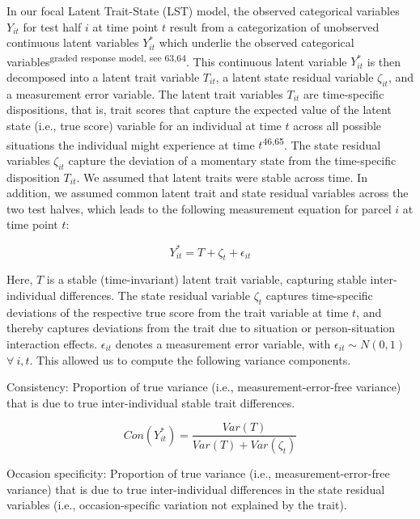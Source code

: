 \documentclass[
  man,floatsintext]{apa6}
\begin{document}
In our focal Latent Trait-State (LST) model, the observed categorical variables \(Y_{it}\) for test half \(i\) at time point \(t\) result from a categorization of unobserved continuous latent variables \(Y^*_{it}\) which underlie the observed categorical variables\textsuperscript{graded response model, see 63,64}. This continuous latent variable \(Y^*_{it}\) is then decomposed into a latent trait variable \(T_{it}\), a latent state residual variable \(\zeta_{it}\), and a measurement error variable. The latent trait variables \(T_{it}\) are time-specific dispositions, that is, trait scores that capture the expected value of the latent state (i.e., true score) variable for an individual at time \(t\) across all possible situations the individual might experience at time \(t\)\textsuperscript{46,65}. The state residual variables \(\zeta_{it}\) capture the deviation of a momentary state from the time-specific disposition \(T_{it}\). We assumed that latent traits were stable across time. In addition, we assumed common latent trait and state residual variables across the two test halves, which leads to the following measurement equation for parcel \(i\) at time point \(t\):

\begin{equation}
Y^*_{it}= T + \zeta_t + \epsilon_{it}
\end{equation}

Here, \(T\) is a stable (time-invariant) latent trait variable, capturing stable inter-individual differences. The state residual variable \(\zeta_t\) captures time-specific deviations of the respective true score from the trait variable at time \(t\), and thereby captures deviations from the trait due to situation or person-situation interaction effects. \(\epsilon_{it}\) denotes a measurement error variable, with \(\epsilon_{it} \sim N(0,1)\) \(\forall~ i,t\). This allowed us to compute the following variance components.

Consistency: Proportion of true variance (i.e., measurement-error-free variance) that is due to true inter-individual stable trait differences.

\begin{equation}
Con(Y^*_{it})=\frac{Var(T)}{Var(T)+Var(\zeta_t)}
\end{equation}

Occasion specificity: Proportion of true variance (i.e., measurement-error-free variance) that is due to true inter-individual differences in the state residual variables (i.e., occasion-specific variation not explained by the trait).
\end{document}
